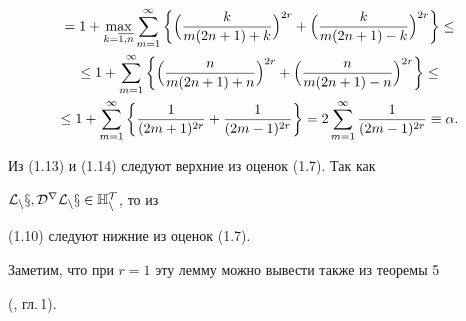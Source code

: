 \begin{pf}
\begin{gather}
%


= 1+ \max_{k=\overline{1,n}}\sum_{m=1}^\infty


\left\{ \Bigl( \frac{k}{m(2n+1)+k}\Bigr)^{2r} +


\Bigl( \frac{k}{m(2n+1)-k}\Bigr)^{2r}\right\} \le\notag\\


%


\le 1+ \sum_{m=1}^\infty \left\{ \Bigl( \frac{n}{m(2n+1)+n}\Bigr)^{2r} +


\Bigl( \frac{n}{m(2n+1)-n}\Bigr)^{2r}\right\} \le\notag\\


%


\le 1+ \sum_{m=1}^\infty \left\{ \frac{1}{(2m+1)^{2r}} +


\frac{1}{(2m-1)^{2r}}\right\} =


2 \sum_{m=1}^\infty \frac{1}{(2m-1)^{2r}}\equiv \alpha .


\end{gather}


%


Из (1.13) и (1.14) следуют верхние из оценок (1.7). Так как


$\cal{L}_nx, D^r\cal {L}_nx\in \Bbb{H}_n^T$, то из


(1.10) следуют нижние из оценок (1.7).


\end{pf}





Заметим, что при $r=1$ эту лемму можно вывести также из теоремы 5


(\cite{Erm}, гл.\,1).






